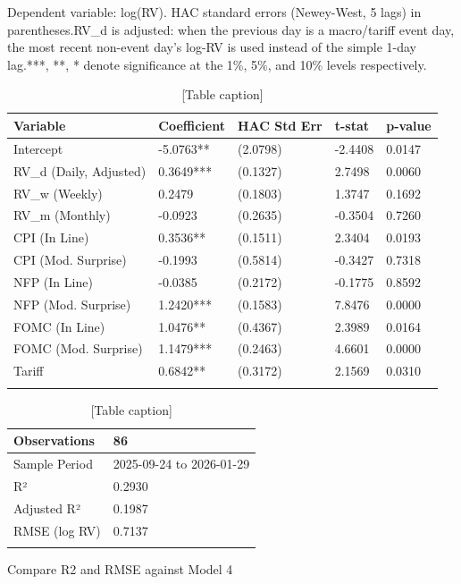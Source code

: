 \documentclass[12pt,a4paper]{report}
\begin{document}
Dependent variable: log(RV). HAC standard errors (Newey-West, 5 lags) in parentheses.RV_d is adjusted: when the previous day is a macro/tariff event day, the most recent non-event day's log-RV is used instead of the simple 1-day lag.***, **, * denote significance at the 1\%, 5\%, and 10\% levels respectively.

\begin{table}[H]
\centering
\begin{tabular}{|l|l|l|l|l|}
\hline
Variable & Coefficient & HAC Std Err & t-stat & p-value \\
\hline
Intercept & -5.0763** & (2.0798) & -2.4408 & 0.0147 \\
\hline
RV_d (Daily, Adjusted) & 0.3649*** & (0.1327) & 2.7498 & 0.0060 \\
\hline
RV_w (Weekly) & 0.2479 & (0.1803) & 1.3747 & 0.1692 \\
\hline
RV_m (Monthly) & -0.0923 & (0.2635) & -0.3504 & 0.7260 \\
\hline
CPI (In Line) & 0.3536** & (0.1511) & 2.3404 & 0.0193 \\
\hline
CPI (Mod. Surprise) & -0.1993 & (0.5814) & -0.3427 & 0.7318 \\
\hline
NFP (In Line) & -0.0385 & (0.2172) & -0.1775 & 0.8592 \\
\hline
NFP (Mod. Surprise) & 1.2420*** & (0.1583) & 7.8476 & 0.0000 \\
\hline
FOMC (In Line) & 1.0476** & (0.4367) & 2.3989 & 0.0164 \\
\hline
FOMC (Mod. Surprise) & 1.1479*** & (0.2463) & 4.6601 & 0.0000 \\
\hline
Tariff & 0.6842** & (0.3172) & 2.1569 & 0.0310 \\
\hline
 &  &  &  &  \\
\hline
\end{tabular}
\caption{[Table caption]}
\end{table}
\begin{table}[H]
\centering
\begin{tabular}{|l|l|}
\hline
Observations & 86 \\
\hline
Sample Period & 2025-09-24 to 2026-01-29 \\
\hline
R² & 0.2930 \\
\hline
Adjusted R² & 0.1987 \\
\hline
RMSE (log RV) & 0.7137 \\
\hline
 &  \\
\hline
\end{tabular}
\caption{[Table caption]}
\end{table}
Compare R2 and RMSE against Model 4
\end{document}
